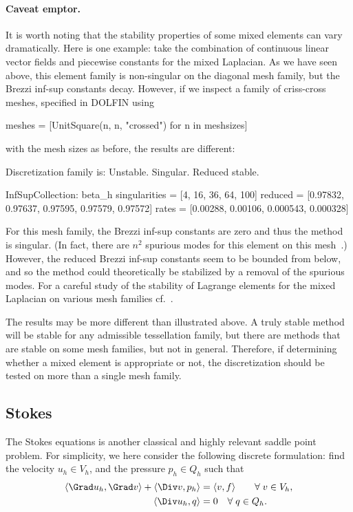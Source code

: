 \paragraph*{Caveat emptor.}

It is worth noting that the stability properties of some mixed
elements can vary dramatically. Here is one example: take the
combination of continuous linear vector fields and piecewise constants
for the mixed Laplacian. As we have seen above, this element family is
non-singular on the diagonal mesh family, but the Brezzi inf-sup
constants decay. However, if we inspect a family of criss-cross
meshes, specified in DOLFIN using
\begin{python}
meshes = [UnitSquare(n, n, "crossed") for n in meshsizes]
\end{python}
with the mesh sizes as before, the results are different:
\begin{python}
Discretization family is: Unstable. Singular. Reduced stable.

InfSupCollection: beta_h
singularities = [4, 16, 36, 64, 100]
reduced =        [0.97832, 0.97637, 0.97595, 0.97579, 0.97572]
rates  =         [0.00288, 0.00106, 0.000543, 0.000328]
\end{python}
For this mesh family, the Brezzi inf-sup constants are zero and thus
the method is singular. (In fact, there are $n^2$ spurious modes for
this element on this mesh~\cite{Qin1994}.) However, the reduced Brezzi
inf-sup constants seem to be bounded from below, and so the method
could theoretically be stabilized by a removal of the spurious
modes. For a careful study of the stability of Lagrange elements for
the mixed Laplacian on various mesh families
cf.~\cite{ArnoldRognes2009}.

The results may be more different than illustrated above. A truly
stable method will be stable for any admissible tessellation family,
but there are methods that are stable on some mesh families, but not in
general.  Therefore, if determining whether a mixed element is
appropriate or not, the discretization should be tested on more than a
single mesh family.

\subsection{Stokes}

The Stokes equations is another classical and highly relevant saddle
point problem. For simplicity, we here consider the following discrete
formulation: find the velocity $u_h \in V_h$, and the pressure $p_h
\in Q_h$ such that
\begin{equation}
  \label{rognes:eq:stokes}
  \begin{split}
    \langle \Grad u_h, \Grad v \rangle + \langle \Div v, p_h \rangle &=
    \langle v, f \rangle
    \quad\quad \rognesforalls v \in V_h, \\
    \langle \Div u_h, q \rangle &= 0
    \quad \rognesforalls q \in Q_h.
  \end{split}
\end{equation}

